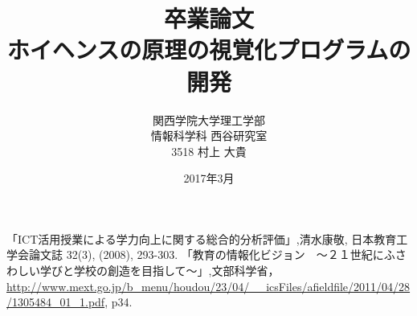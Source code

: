 \documentclass[12pt,a4]{jreport}%
\title{卒業論文\\ホイヘンスの原理の視覚化プログラムの開発}
\author{関西学院大学理工学部\\情報科学科 西谷研究室\\3518 村上 大貴}
\date{2017年3月}
\begin{document}
\maketitle
\newpage



\tableofcontents



\begin{thebibliography}{9}
「ICT活用授業による学力向上に関する総合的分析評価」,清水康敬, 日本教育工学会論文誌 32(3), (2008), 293-303.
「教育の情報化ビジョン　〜２１世紀にふさわしい学びと学校の創造を目指して〜」,文部科学省，\url{http://www.mext.go.jp/b_menu/houdou/23/04/__icsFiles/afieldfile/2011/04/28/1305484_01_1.pdf}, p34.
\end{thebibliography}
\end{document}
